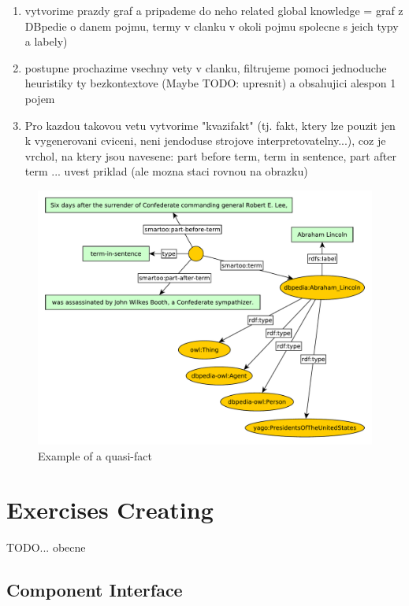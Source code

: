 \documentclass[a4paper, 12pt, twoside]{fithesis2}		%
\renewcommand{\_}{\leavevmode \kern0.0em\vbox{\hrule width0.4em}}
\begin{document}
\begin{enumerate}
  \item vytvorime prazdy graf a pripademe do neho related global knowledge = graf z DBpedie o danem pojmu, termy v clanku v okoli pojmu spolecne s jeich typy a labely)
  \item postupne prochazime vsechny vety v clanku, filtrujeme pomoci jednoduche heuristiky ty bezkontextove (Maybe TODO: upresnit) a obsahujici alespon 1 pojem
  \item Pro kazdou takovou vetu vytvorime "kvazifakt" (tj. fakt, ktery lze pouzit jen k vygenerovani cviceni, neni jendoduse strojove interpretovatelny...), coz je vrchol, na ktery jsou navesene: part before term, term in sentence, part after term ... uvest priklad (ale mozna staci rovnou na obrazku)
\end{enumerate}

\begin{figure}[h]
  \centering
  \includegraphics[width=\textwidth]{images/quasi-fact-lincoln.pdf}
  \caption{Example of a quasi-fact}
  \label{fig:quasi-fact}
\end{figure}

\section{Exercises Creating}
\label{sec:smartoo-exercises}

TODO... obecne

\subsection{Component Interface}
\end{document}
